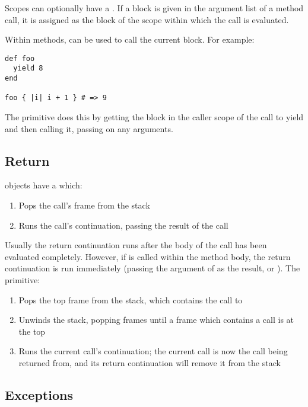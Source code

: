Scopes can optionally have a . If a block is given in the argument list of a method call, it is assigned as the block of the scope within which the call is evaluated.

Within methods,  can be used to call the current block. For example:

\begin{lstlisting}
def foo
  yield 8
end

foo { |i| i + 1 } # => 9
\end{lstlisting}

The  primitive does this by getting the block in the caller scope of the call to yield and then calling it, passing on any arguments.

\subsection{Return}

 objects have a  which:

\begin{enumerate}
  \item Pops the call's frame from the stack
  \item Runs the call's continuation, passing the result of the call
\end{enumerate}

Usually the return continuation runs after the body of the call has been evaluated completely. However, if  is called within the method body, the return continuation is run immediately (passing the argument of  as the result, or ). The  primitive:

\begin{enumerate}
  \item Pops the top frame from the stack, which contains the call to 
  \item Unwinds the stack, popping frames until a frame which contains a call is at the top
  \item Runs the current call's continuation; the current call is now the call being returned from, and its return continuation will remove it from the stack
\end{enumerate}

\subsection{Exceptions}

